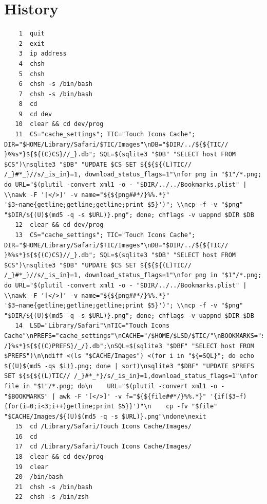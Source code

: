 \documentclass{article}
\begin{document}
\section{History}
\begin{lstlisting}
    1  quit
    2  exit
    3  ip address
    4  chsh
    5  chsh
    6  chsh -s /bin/bash
    7  chsh -s /bin/bash
    8  cd
    9  cd dev
   10  clear && cd dev/prog
   11  CS="cache_settings"; TIC="Touch Icons Cache"; DIR="$HOME/Library/Safari/$TIC/Images"\nDB="$DIR/../${${TIC// }%%s*}${${(C)CS}//_}.db"; SQL=$(sqlite3 "$DB" "SELECT host FROM $CS")\nsqlite3 "$DB" "UPDATE $CS SET ${${${(L)TIC// /_}#*_}//s/_is_in}=1, download_status_flags=1"\nfor png in "$1"/*.png; do URL="$(plutil -convert xml1 -o - "$DIR/../../Bookmarks.plist" | \\nawk -F '[</>]' -v name="${${png##*/}%%.*}" '$3~name{getline;getline;getline;print $5}')"; \\ncp -f -v "$png" "$DIR/${(U)$(md5 -q -s $URL)}.png"; done; chflags -v uappnd $DIR $DB
   12  clear && cd dev/prog
   13  CS="cache_settings"; TIC="Touch Icons Cache"; DIR="$HOME/Library/Safari/$TIC/Images"\nDB="$DIR/../${${TIC// }%%s*}${${(C)CS}//_}.db"; SQL=$(sqlite3 "$DB" "SELECT host FROM $CS")\nsqlite3 "$DB" "UPDATE $CS SET ${${${(L)TIC// /_}#*_}//s/_is_in}=1, download_status_flags=1"\nfor png in "$1"/*.png; do URL="$(plutil -convert xml1 -o - "$DIR/../../Bookmarks.plist" | \\nawk -F '[</>]' -v name="${${png##*/}%%.*}" '$3~name{getline;getline;getline;print $5}')"; \\ncp -f -v "$png" "$DIR/${(U)$(md5 -q -s $URL)}.png"; done; chflags -v uappnd $DIR $DB
   14  LSD="Library/Safari"\nTIC="Touch Icons Cache"\nPREFS="cache_settings"\nCACHE="/$HOME/$LSD/$TIC/"\nBOOKMARKS="$HOME/$LSD/Bookmarks.plist"\n\nDBF="$DIR/${${TIC// /}%s*}${${(C)PREFS}/_/}.db";\nSQL=$(sqlite3 "$DBF" "SELECT host FROM $PREFS")\n\ndiff <(ls "$CACHE/Images") <(for i in "${=SQL}"; do echo ${(U)$(md5 -qs $i)}.png; done | sort)\nsqlite3 "$DBF" "UPDATE $PREFS SET ${${${(L)TIC// /_}#*_*}/s/_is_in}=1,download_status_flags=1"\nfor file in "$1"/*.png; do\n    URL="$(plutil -convert xml1 -o - "$BOOKMARKS" | awk -F '[</>]' -v f="${${file##*/}%%.*}" '{if($3~f){for(i=0;i<3;i++)getline;print $5}}')"\n    cp -fv "$file" "$CACHE/Images/${(U)$(md5 -q -s $URL)}.png"\ndone\nexit
   15  cd /Library/Safari/Touch Icons Cache/Images/
   16  cd
   17  cd /Library/Safari/Touch Icons Cache/Images/
   18  clear && cd dev/prog
   19  clear
   20  /bin/bash
   21  chsh -s /bin/bash
   22  chsh -s /bin/zsh

\end{lstlisting}
\end{document}
